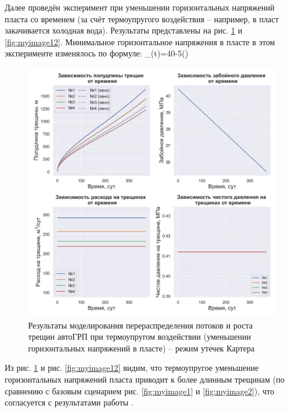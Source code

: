 Далее проведён эксперимент при уменьшении горизонтальных напряжений пласта со временем (за счёт термоупругого воздействия -- например, в пласт закачивается холодная вода).
Результаты представлены на рис. \ref{fig:myimage11} и \ref{fig:myimage12}.
Минимальное горизонтальное напряжения в пласте в этом эксперименте изменялось по формуле:
\beq
\sigma_{}(t)=40-5\cdot\left(\right)
\eeq

\begin{figure}[H] 
\center
\includegraphics[width=\linewidth]{images/myimage11.jpg}
\caption{Результаты моделирования перераспределения потоков и роста трещин автоГРП при термоупругом воздействии (уменьшении горизонтальных напряжений в пласте) -- режим утечек Картера}
\label{fig:myimage11}
\end{figure}

Из рис. \ref{fig:myimage11} и рис. \ref{fig:myimage12} видим, что термоупругое уменьшение горизонтальных напряжений пласта  приводит к более длинным трещинам (по сравнению с базовым сценарием рис. \ref{fig:myimage1} и \ref{fig:myimage2}), что согласуется с результатами работы \cite{perkins_gonzalez}.

